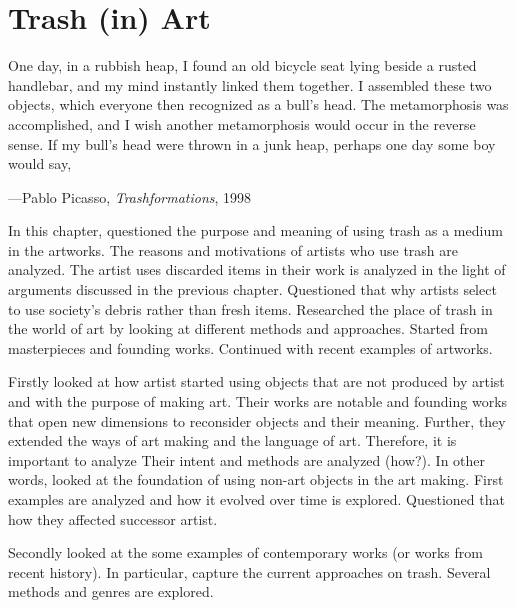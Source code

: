 \chapter{Trash (in) Art}





\epigraph{One day, in a rubbish heap, I found an old bicycle seat lying beside a rusted handlebar, and my mind instantly linked them together. I assembled these two objects, which everyone then recognized as a bull’s head. The metamorphosis was accomplished, and I wish another metamorphosis would occur in the reverse sense. If my bull’s head were thrown in a junk heap, perhaps one day some boy would say, }{\hfill ---Pablo Picasso, \textit{Trashformations}, 1998}






In this chapter, questioned the purpose and meaning of using trash as a medium in the artworks. The reasons and motivations of artists who use trash are analyzed. The artist uses discarded items in their work is analyzed in the light of arguments discussed in the previous chapter. Questioned that why artists select to use society's debris rather than fresh items. Researched the place of trash in the world of art by looking at different methods and approaches. Started from masterpieces and founding works. Continued with recent examples of artworks.  



Firstly looked at how artist started using objects that are not produced by artist and with the purpose of making art. Their works are notable and founding works that open new dimensions to reconsider objects and their meaning. Further, they extended the ways of art making and the language of art. Therefore, it is important to analyze Their intent and methods are analyzed (how?). In other words, looked at the foundation of using non-art objects in the art making. First examples are analyzed and how it evolved over time is explored. Questioned that how they affected successor artist.

Secondly looked at the some examples of contemporary works (or works from recent history). In particular, capture the current approaches on trash. Several methods and genres are explored. 


